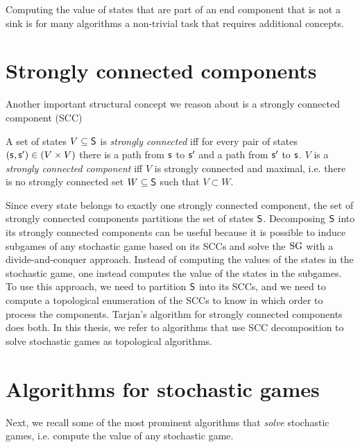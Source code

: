 Computing the value of states that are part of an end component that is not a sink is for many algorithms a non-trivial task that requires
additional concepts.

\section{Strongly connected components} \label{sec:SCC}
Another important structural concept we reason about is a strongly connected component (SCC)
\begin{definition}\label{def:SCC}
A set of states $V \subseteq \mathsf{S}$ is \emph{strongly connected} iff for every pair of states $(\state, \state') \in (V \times V)$ there is a path from $\state$ to $\state'$ and a path from $\state'$ to $\state$.
$V$ is a \emph{strongly connected component} iff $V$ is strongly connected and maximal, i.e. there is no strongly connected set $W \subseteq \mathsf{S}$ such that $V \subset W$.
\end{definition}

Since every state belongs to exactly one strongly connected component, the set of strongly connected components partitions the set of states $\mathsf{S}$.
Decomposing $\mathsf{S}$ into its strongly connected components can be useful because it is possible to induce subgames of any stochastic game based on its
SCCs and solve the $\textrm{SG}$ with a divide-and-conquer approach. 
Instead of computing the values of the states in the stochastic game, one instead computes the value of the states in the subgames.
To use this approach, we need to partition $\mathsf{S}$ into its SCCs, and we need to compute a topological enumeration of the SCCs to know in which order to process the components.
Tarjan's algorithm for strongly connected components \cite{TarjansAlgorithm} does both. 
In this thesis, we refer to algorithms that use SCC decomposition to solve stochastic games as topological algorithms.

\section{Algorithms for stochastic games} \label{sec:SGAlgos}
Next, we recall some of the most prominent algorithms that \emph{solve} stochastic games, i.e. compute the value of any stochastic game.

